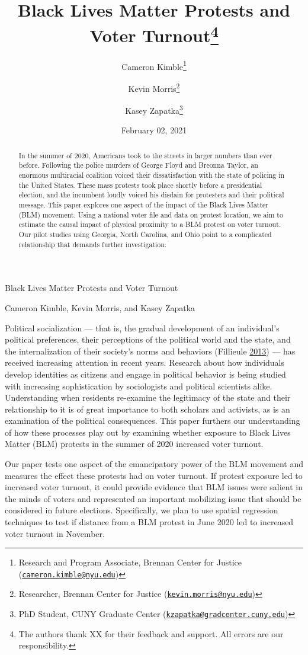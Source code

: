 \documentclass[
  12pt,
]{article}
\title{Black Lives Matter Protests and Voter Turnout\thanks{The authors thank XX for their feedback and support. All errors are our responsibility.}}
\author{Cameron Kimble\footnote{Research and Program Associate, Brennan Center for Justice (\href{mailto:cameron.kimble@nyu.edu}{\nolinkurl{cameron.kimble@nyu.edu}})} \and Kevin Morris\footnote{Researcher, Brennan Center for Justice (\href{mailto:kevin.morris@nyu.edu}{\nolinkurl{kevin.morris@nyu.edu}})} \and Kasey Zapatka\footnote{PhD Student, CUNY Graduate Center (\href{mailto:kzapatka@gradcenter.cuny.edu}{\nolinkurl{kzapatka@gradcenter.cuny.edu}})}}
\date{February 02, 2021}
\begin{document}
\maketitle
\begin{abstract}
In the summer of 2020, Americans took to the streets in larger numbers than ever before. Following the police murders of George Floyd and Breonna Taylor, an enormous multiracial coalition voiced their dissatisfaction with the state of policing in the United States. These mass protests took place shortly before a presidential election, and the incumbent loudly voiced his disdain for protesters and their political message. This paper explores one aspect of the impact of the Black Lives Matter (BLM) movement. Using a national voter file and data on protest location, we aim to estimate the causal impact of physical proximity to a BLM protest on voter turnout. Our pilot studies using Georgia, North Carolina, and Ohio point to a complicated relationship that demands further investigation.
\end{abstract}

\pagebreak

\begin{center}
Black Lives Matter Protests and Voter Turnout

Cameron Kimble, Kevin Morris, and Kasey Zapatka
\end{center}

Political socialization --- that is, the gradual development of an individual's political preferences, their perceptions of the political world and the state, and the internalization of their society's norms and behaviors (Fillieule \protect\hyperlink{ref-Fillieule2013}{2013}) --- has received increasing attention in recent years. Research about how individuals develop identities as citizens and engage in political behavior is being studied with increasing sophistication by sociologists and political scientists alike. Understanding when residents re-examine the legitimacy of the state and their relationship to it is of great importance to both scholars and activists, as is an examination of the political consequences. This paper furthers our understanding of how these processes play out by examining whether exposure to Black Lives Matter (BLM) protests in the summer of 2020 increased voter turnout.

Our paper tests one aspect of the emancipatory power of the BLM movement and measures the effect these protests had on voter turnout. If protest exposure led to increased voter turnout, it could provide evidence that BLM issues were salient in the minds of voters and represented an important mobilizing issue that should be considered in future elections. Specifically, we plan to use spatial regression techniques to test if distance from a BLM protest in June 2020 led to increased voter turnout in November.
\end{document}
